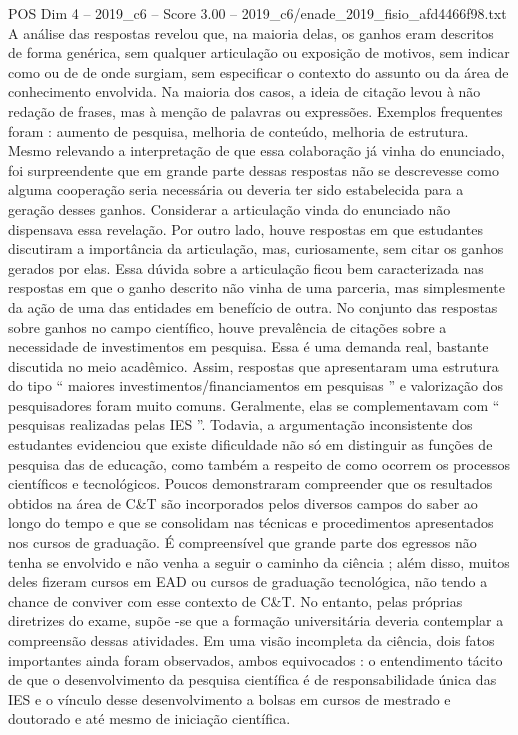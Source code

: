 \begin{textsample}{POS Dim 4 – 2019\_c6 – Score 3.00 – 2019\_c6/enade\_2019\_fisio\_afd4466f98.txt}
A análise das respostas revelou que, na maioria delas, os ganhos eram descritos de forma genérica, sem qualquer articulação ou exposição de motivos, sem indicar como ou de de onde surgiam, sem especificar o contexto do assunto ou da área de conhecimento envolvida.
Na maioria dos casos, a ideia de citação levou à não redação de frases, mas à menção de palavras ou expressões.
Exemplos frequentes foram : aumento de pesquisa, melhoria de conteúdo, melhoria de estrutura.
Mesmo relevando a interpretação de que essa colaboração já vinha do enunciado, foi surpreendente que em grande parte dessas respostas não se descrevesse como alguma cooperação seria necessária ou deveria ter sido estabelecida para a geração desses ganhos.
Considerar a articulação vinda do enunciado não dispensava essa revelação.
Por outro lado, houve respostas em que estudantes discutiram a importância da articulação, mas, curiosamente, sem citar os ganhos gerados por elas.
Essa dúvida sobre a articulação ficou bem caracterizada nas respostas em que o ganho descrito não vinha de uma parceria, mas simplesmente da ação de uma das entidades em benefício de outra.
No conjunto das respostas sobre ganhos no campo científico, houve prevalência de citações sobre a necessidade de investimentos em pesquisa.
Essa é uma demanda real, bastante discutida no meio acadêmico.
Assim, respostas que apresentaram uma estrutura do tipo “ maiores investimentos/financiamentos em pesquisas ” e valorização dos pesquisadores foram muito comuns.
Geralmente, elas se complementavam com “ pesquisas realizadas pelas IES ”.
Todavia, a argumentação inconsistente dos estudantes evidenciou que existe dificuldade não só em distinguir as funções de pesquisa das de educação, como também a respeito de como ocorrem os processos científicos e tecnológicos.
Poucos demonstraram compreender que os resultados obtidos na área de C\&T são incorporados pelos diversos campos do saber ao longo do tempo e que se consolidam nas técnicas e procedimentos apresentados nos cursos de graduação.
É compreensível que grande parte dos egressos não tenha se envolvido e não venha a seguir o caminho da ciência ; além disso, muitos deles fizeram cursos em EAD ou cursos de graduação tecnológica, não tendo a chance de conviver com esse contexto de C\&T.
No entanto, pelas próprias diretrizes do exame, supõe -se que a formação universitária deveria contemplar a compreensão dessas atividades.
Em uma visão incompleta da ciência, dois fatos importantes ainda foram observados, ambos equivocados : o entendimento tácito de que o desenvolvimento da pesquisa científica é de responsabilidade única das IES e o vínculo desse desenvolvimento a bolsas em cursos de mestrado e doutorado e até mesmo de iniciação científica.

\end{textsample}
